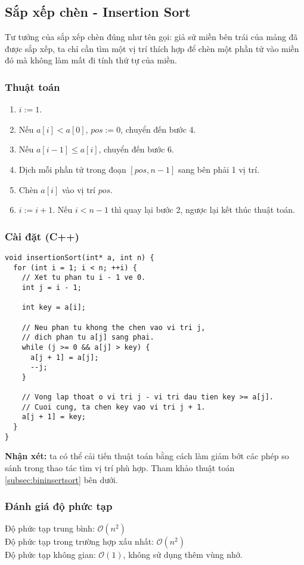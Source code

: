 \documentclass[]{article}
\begin{document}
\subsection{Sắp xếp chèn - Insertion Sort}
Tư tưởng của sắp xếp chèn đúng như tên gọi: giả sử miền bên trái của mảng đã được sắp xếp, ta chỉ cần tìm một vị trí thích hợp để chèn một phần tử vào miền đó mà không làm mất đi tính thứ tự của miền.

\subsubsection{Thuật toán}
\begin{enumerate}
\item $i := 1$.
\item Nếu $a[i] < a[0]$, $pos := 0$, chuyển đến bước 4.
\item Nếu $a[i - 1] \leq a[i]$, chuyển đến bước 6.
\item Dịch mỗi phần tử trong đoạn $[pos, n - 1]$ sang bên phải 1 vị trí.
\item Chèn $a[i]$ vào vị trí $pos$.
\item $i := i + 1$. Nếu $i < n - 1$ thì quay lại bước 2, ngược lại kết thúc thuật toán.
\end{enumerate}

\subsubsection{Cài đặt (C++)}
\begin{lstlisting}
void insertionSort(int* a, int n) {
  for (int i = 1; i < n; ++i) {
    // Xet tu phan tu i - 1 ve 0.
    int j = i - 1;

    int key = a[i];

    // Neu phan tu khong the chen vao vi tri j,
    // dich phan tu a[j] sang phai.
    while (j >= 0 && a[j] > key) {
      a[j + 1] = a[j];
      --j;
    }

    // Vong lap thoat o vi tri j - vi tri dau tien key >= a[j].
    // Cuoi cung, ta chen key vao vi tri j + 1.
    a[j + 1] = key;
  }
}
\end{lstlisting}
\textbf{Nhận xét:} ta có thể cải tiến thuật toán bằng cách làm giảm bớt các phép so sánh trong thao tác tìm vị trí phù hợp. Tham khảo thuật toán \ref{subsec:bininsertsort} bên dưới.

\subsubsection{Đánh giá độ phức tạp}
Độ phức tạp trung bình: $\mathcal{O}(n^2)$
\\
Độ phức tạp trong trường hợp xấu nhất: $\mathcal{O}(n^2)$
\\
Độ phức tạp không gian: $\mathcal{O}(1)$, không sử dụng thêm vùng nhớ.
\end{document}
